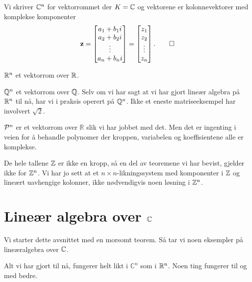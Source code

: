\begin{defn}
Vi skriver $\C^n$ for vektorrommet der $K=\C$ og vektorene er kolonnevektorer med komplekse komponenter 
\[
\V z=
\begin{bmatrix}
a_1+b_1 i    \\ a_2+b_2 i   \\ \vdots \\ a_n+b_n i 
\end{bmatrix}
=
\begin{bmatrix}
z_1    \\ z_2   \\ \vdots \\ z_n
\end{bmatrix}.\qedhere
\]
\end{defn}

\begin{ex}
$\R^n$ et vektorrom over $\R$.
\end{ex}

\begin{ex}
$\Q^n$ et vektorrom over $\Q$. Selv om vi har sagt at vi har gjort lineær algebra på $\R^n$ til nå, har vi i praksis operert på $\Q^n$. Ikke et eneste matriseeksempel har involvert $\sqrt{2}$.
\end{ex}

\begin{ex}
$\P^n$ er et vektorrom over $\mathbb R$ slik vi har jobbet med det. 
Men det er ingenting i veien for å behandle polynomer der kroppen, variabelen og koeffisientene alle er komplekse.
\end{ex}


\begin{ex}
De hele tallene $\Z$ er ikke en kropp, så en del av teoremene vi har bevist, gjelder ikke for $\Z^n$. 
Vi har jo sett at et $n\times n$-likningssystem med komponenter i $\Z$ og lineært uavhengige kolonner,  
ikke nødvendigvis noen løsning i $\Z^n$. 
\end{ex}



\section*{Lineær algebra over $\C$}

Vi starter dette avsnittet med en morsomt teorem. Så tar vi noen eksempler på lineæralgebra over $\C$.

\begin{fishythm}
Alt vi har gjort til nå, fungerer helt likt i $\mathbb C^n$ som i $\R^n$. 
Noen ting fungerer til og med bedre.
\end{fishythm}




